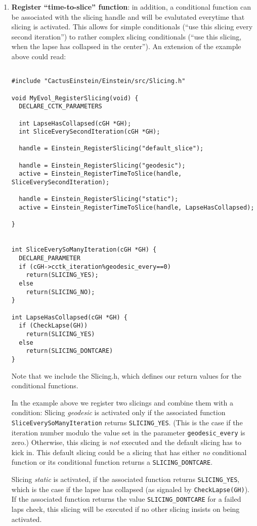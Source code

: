\begin{enumerate}
\item{\bf Register ``time-to-slice'' function}: in addition, a
conditional function can be associated with the slicing handle and 
will be evalutated everytime that slicing is activated. This allows
for simple conditionals (``use this slicing every second iteration'')
to rather complex slicing conditionals (``use this slicing, when the
lapse has collapsed in the center''). An extension of the example
above could read:
\begin{verbatim}
 
#include "CactusEinstein/Einstein/src/Slicing.h"

void MyEvol_RegisterSlicing(void) {
  DECLARE_CCTK_PARAMETERS

  int LapseHasCollapsed(cGH *GH);
  int SliceEverySecondIteration(cGH *GH);

  handle = Einstein_RegisterSlicing("default_slice");

  handle = Einstein_RegisterSlicing("geodesic");
  active = Einstein_RegisterTimeToSlice(handle, SliceEverySecondIteration);	

  handle = Einstein_RegisterSlicing("static");
  active = Einstein_RegisterTimeToSlice(handle, LapseHasCollapsed);	

}


int SliceEverySoManyIteration(cGH *GH) {
  DECLARE_PARAMETER
  if (cGH->cctk_iteration%geodesic_every==0) 
    return(SLICING_YES);
  else 
    return(SLICING_NO);
}

int LapseHasCollapsed(cGH *GH) {
  if (CheckLapse(GH)) 
    return(SLICING_YES)
  else
    return(SLICING_DONTCARE)
}

\end{verbatim}
Note that we include the Slicing.h, which defines our return values
for the conditional functions. 

In the example above we register two
slicings and combine them with a condition:
Slicing {\em geodesic} is activated only if the associated function
{\tt SliceEverySoManyIteration} returns {\tt SLICING\_YES}. (This is
the case if the iteration number modulo the value set in the parameter 
{\tt geodesic\_every} is zero.)
Otherwise, this slicing is {\em not} executed and the default slicing
has to kick in. This default slicing could 
be a slicing that has either {\em no} conditional function or its
conditional function returns a {\tt SLICING\_DONTCARE}.

Slicing {\em static} is activated, if the associated function returns
{\tt SLICING\_YES}, which is the case if the lapse has collapsed 
(as signaled by {\tt CheckLapse(GH)}). If the associated function returns
the value {\tt SLICING\_DONTCARE} for a failed laps check,
this slicing will be executed if no other slicing insists on being
activated. 



\end{enumerate}
